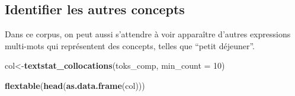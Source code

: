 \documentclass[
]{book}
\newenvironment{Shaded}{\begin{snugshade}}{\end{snugshade}}
\newcommand{\DataTypeTok}[1]{\textcolor[rgb]{0.13,0.29,0.53}{#1}}
\newcommand{\DecValTok}[1]{\textcolor[rgb]{0.00,0.00,0.81}{#1}}
\newcommand{\KeywordTok}[1]{\textcolor[rgb]{0.13,0.29,0.53}{\textbf{#1}}}
\newcommand{\NormalTok}[1]{#1}
\begin{document}
\hypertarget{identifier-les-autres-concepts}{%
\subsection{Identifier les autres concepts}\label{identifier-les-autres-concepts}}

Dans ce corpus, on peut aussi s'attendre à voir apparaître d'autres expressions multi-mots qui représentent des concepts, telles que ``petit déjeuner''.

\begin{Shaded}
\begin{Highlighting}[]
\NormalTok{col<-}\KeywordTok{textstat_collocations}\NormalTok{(toks_comp, }\DataTypeTok{min_count =} \DecValTok{10}\NormalTok{)}

\KeywordTok{flextable}\NormalTok{(}\KeywordTok{head}\NormalTok{(}\KeywordTok{as.data.frame}\NormalTok{(col)))}
\end{Highlighting}
\end{Shaded}

\providecommand{\docline}[3]{\noalign{\global\setlength{\arrayrulewidth}{#1}}\arrayrulecolor[HTML]{#2}\cline{#3}}

\setlength{\tabcolsep}{2pt}

\renewcommand*{\arraystretch}{1.5}
\end{document}
